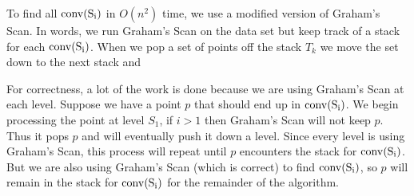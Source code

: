 \documentclass[11pt]{article}
\newcommand{\conv}[1]{\rm{conv}(#1)}
\begin{document}
\answer
To find all $\conv{S_i}$ in $O(n^2)$ time, we use a modified version of Graham's Scan.
In words, we run Graham's Scan on the data set but keep track of a stack for each $\conv{S_i}$.
When we pop a set of points off the stack $T_k$ we move the set down to the next stack and

For correctness, a lot of the work is done because we are using Graham's Scan at each level.
Suppose we have a point $p$ that should end up in $\conv{S_i}$.
We begin processing the point at level $S_1$, if $i > 1$ then Graham's Scan will not keep $p$.
Thus it pops $p$ and will eventually push it down a level.
Since every level is using Graham's Scan, this process will repeat until $p$ encounters the stack for $\conv{S_i}$.
But we are also using Graham's Scan (which is correct) to find $\conv{S_i}$, so $p$ will remain in the stack for $\conv{S_i}$ for the remainder of the algorithm.

%
%
%
%
\end{document}
